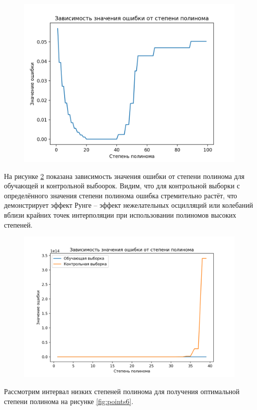 \documentclass[12pt]{report}
\begin{document}
\begin{figure}[h!]
  \centering
  \includegraphics[width = \linewidth]{res_2_1.png}
  \caption{}
  \label{fig:points4}
\end{figure}

На рисунке \ref{fig:points5} показана зависимость значения ошибки от степени полинома для обучающей и контрольной выбоорок. Видим, что для контрольной выборки с определённого значения степени полинома ошибка стремительно растёт, что демонстрирует эффект Рунге -- эффект нежелательных осцилляций или колебаний вблизи крайних точек интерполяции при использовании полиномов высоких степеней.

\begin{figure}[h!]
  \centering
  \includegraphics[width = \linewidth]{res_2_2.png}
  \caption{}
  \label{fig:points5}
\end{figure}
\newpage
Рассмотрим интервал низких степеней полинома для получения оптимальной степени полинома на рисунке \ref{fig:points6}.
\end{document}
